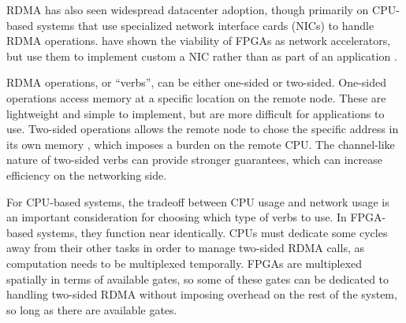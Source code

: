 RDMA has also seen widespread datacenter adoption, though primarily on CPU-based systems that use specialized network interface cards (NICs) to handle RDMA operations. \citet{star} have shown the viability of FPGAs as network accelerators, but \citeauthor{star} use them to implement custom a NIC rather than as part of an application \cite{star}.

RDMA operations, or ``verbs'', can be either one-sided or two-sided. One-sided operations access memory at a specific location on the remote node. These are lightweight and simple to implement, but are more difficult for applications to use. Two-sided operations allows the remote node to chose the specific address in its own memory \cite{base}, which imposes a burden on the remote CPU. The channel-like nature of two-sided verbs can provide stronger guarantees, which can increase efficiency on the networking side.

For CPU-based systems, the tradeoff between CPU usage and network usage is an important consideration for choosing which type of verbs to use. In FPGA-based systems, they function near identically. CPUs must dedicate some cycles away from their other tasks in order to manage two-sided RDMA calls, as computation needs to be multiplexed temporally. FPGAs are multiplexed spatially in terms of available gates, so some of these gates can be dedicated to handling two-sided RDMA without imposing overhead on the rest of the system, so long as there are available gates.
